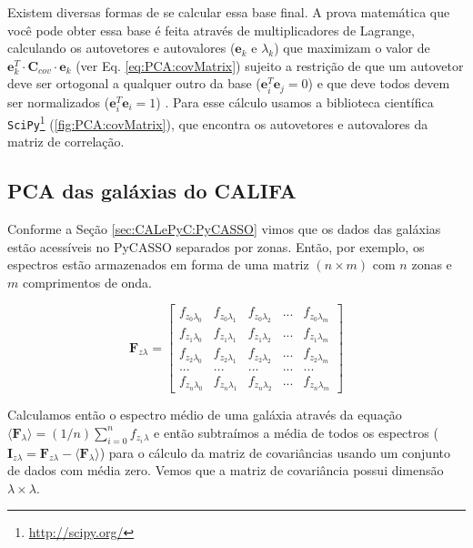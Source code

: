 Existem diversas formas de se calcular essa base final. A prova matemática que
você pode obter essa base é feita através de multiplicadores de Lagrange,
calculando os autovetores e autovalores ($\mathbf{e}{}_k$ e $\lambda_k$) que
maximizam o valor de $\mathbf{e}{}_k^T \cdot \mathbf{C}{}_{cov} \cdot
\mathbf{e}{}_k$ (ver Eq. \ref{eq:PCA:covMatrix}) sujeito a restrição de que um
autovetor deve ser ortogonal a qualquer outro da base ($\mathbf{e}{}_i^T
\mathbf{e}{}_j = 0$) e que deve todos devem ser normalizados ($\mathbf{e}{}_i^T
\mathbf{e}{}_i = 1$) \citep[][cap 1]{JolliffePCA1986}. Para esse cálculo usamos
a biblioteca científica \texttt{SciPy}\footnote{\url{http://scipy.org/}}
(\ref{fig:PCA:covMatrix}), que encontra os autovetores e autovalores da matriz
de correlação.

\subsection{PCA das galáxias do CALIFA}

Conforme a Seção \ref{sec:CALePyC:PyCASSO} vimos que os dados das galáxias estão
acessíveis no PyCASSO separados por zonas. Então, por exemplo, os espectros
estão armazenados em forma de uma matriz $(n \times m)$ com $n$ zonas e $m$
comprimentos de onda.

\begin{equation}
    \label{eq:PCA:fluxMatrix}
    \textbf{F}{}_{z \lambda} = \left[
    \begin{array}{ccccc}
        f_{z_0 \lambda_0} & f_{z_0 \lambda_1} & f_{z_0 \lambda_2} & ... & f_{z_0 \lambda_m} \\
        f_{z_1 \lambda_0} & f_{z_1 \lambda_1} & f_{z_1 \lambda_2} & ... & f_{z_1 \lambda_m} \\
        f_{z_2 \lambda_0} & f_{z_2 \lambda_1} & f_{z_2 \lambda_2} & ... & f_{z_2 \lambda_m} \\
        ...               & ...               & ...               & ... & ...               \\
        f_{z_n \lambda_0} & f_{z_n \lambda_1} & f_{z_n \lambda_2} & ... & f_{z_n \lambda_m} 
    \end{array} 
    \right]
\end{equation}

Calculamos então o espectro médio de uma galáxia através da equação $\langle
\textbf{F}{}_\lambda \rangle = (1 / n) \sum_{i=0}^{n} f_{z_i}{}_{\lambda}$ e
então subtraímos a média de todos os espectros ($\textbf{I}{}_{z \lambda} =
\textbf{F}{}_{z \lambda} - \langle \textbf{F}{}_\lambda \rangle$) para o cálculo
da matriz de covariâncias usando um conjunto de dados com média zero. Vemos que
a matriz de covariância possui dimensão $\lambda \times \lambda$. 

